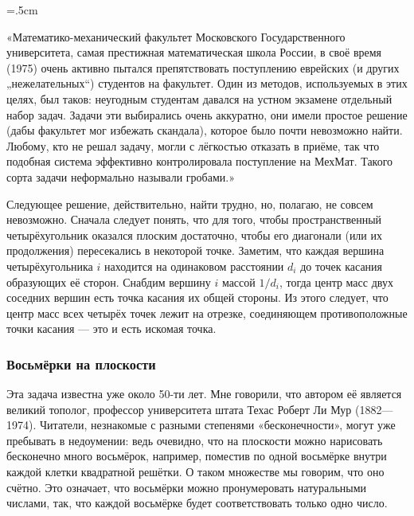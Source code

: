 \medskip

\begin{trivlist}\leftskip=1cm\rightskip=.5cm
\item\relax«Математико-механический факультет Московского Государственного университета, самая престижная математическая школа России, в своё время (1975) очень активно пытался препятствовать поступлению еврейских (и других „нежелательных“) студентов на факультет.
Один из методов, используемых в этих целях, был таков: неугодным студентам давался на устном экзамене отдельный набор задач.
Задачи эти выбирались очень аккуратно, они имели простое решение (дабы факультет мог избежать скандала), которое было почти невозможно найти.
Любому, кто не решал задачу, могли с лёгкостью отказать в приёме, так что подобная система эффективно контролировала поступление на МехМат.
Такого сорта задачи неформально называли \glqq гробами\grqq.» %
\end{trivlist}

\medskip

Следующее решение, действительно, найти трудно, но, полагаю, не совсем невозможно.
Сначала следует понять, что для того, чтобы пространственный четырёхугольник оказался плоским достаточно, чтобы его диагонали (или их продолжения) пересекались в некоторой точке.
Заметим, что каждая вершина четырёхугольника $i$ находится на одинаковом расстоянии $d_i$ до точек касания образующих её сторон.
Снабдим вершину $i$ массой $1/d_i$, тогда центр масс двух соседних вершин есть точка касания их общей стороны.
Из этого следует, что центр масс всех четырёх точек лежит на отрезке, соединяющем противоположные точки касания --- это и есть искомая точка.
\heart

\subsubsection*{Восьмёрки на плоскости}%

Эта задача известна уже около 50-ти лет.
Мне говорили, что автором её является великий тополог, профессор университета штата Техас Роберт Ли Мур (1882---1974). %
Читатели, незнакомые с разными степенями «бесконечности», могут уже пребывать в недоумении: ведь очевидно, что на плоскости можно нарисовать бесконечно много восьмёрок, например, поместив по одной восьмёрке внутри каждой клетки квадратной решётки.
О таком множестве мы говорим, что оно счётно. 
Это означает, что восьмёрки можно пронумеровать натуральными числами, так, что каждой восьмёрке будет соответствовать только одно число.

